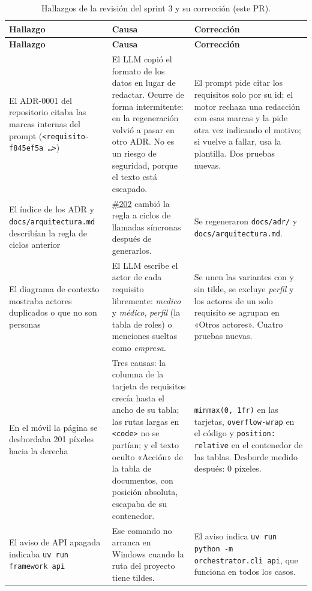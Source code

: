 \documentclass[11pt,a4paper]{report}
\newcommand{\pr}[1]{\href{https://github.com/PracticasESPE/Framework_Desarrollo_Seguro/pull/#1}{\##1}}
\begin{document}
{\small
\begin{longtable}{@{}P{3.6cm}P{5.2cm}P{5.4cm}@{}}
\caption{Hallazgos de la revisión del sprint 3 y su corrección (este PR).}\\
\toprule
\textbf{Hallazgo} & \textbf{Causa} & \textbf{Corrección}\\
\midrule
\endfirsthead
\toprule
\textbf{Hallazgo} & \textbf{Causa} & \textbf{Corrección}\\
\midrule
\endhead
El ADR-0001 del repositorio citaba las marcas internas del prompt (\texttt{<requisito-f845ef5a …>}) & El LLM copió el formato de los datos en lugar de redactar. Ocurre de forma intermitente: en la regeneración volvió a pasar en otro ADR. No es un riesgo de seguridad, porque el texto está escapado. & El prompt pide citar los requisitos solo por su id; el motor rechaza una redacción con esas marcas y la pide otra vez indicando el motivo; si vuelve a fallar, usa la plantilla. Dos pruebas nuevas.\\
El índice de los ADR y \texttt{docs/arquitectura.md} describían la regla de ciclos anterior & \pr{202} cambió la regla a ciclos de llamadas síncronas después de generarlos. & Se regeneraron \texttt{docs/adr/} y \texttt{docs/arquitectura.md}.\\
El diagrama de contexto mostraba actores duplicados o que no son personas & El LLM escribe el actor de cada requisito libremente: \emph{medico} y \emph{médico}, \emph{perfil} (la tabla de roles) o menciones sueltas como \emph{empresa}. & Se unen las variantes con y sin tilde, se excluye \emph{perfil} y los actores de un solo requisito se agrupan en «Otros actores». Cuatro pruebas nuevas.\\
En el móvil la página se desbordaba 201 píxeles hacia la derecha & Tres causas: la columna de la tarjeta de requisitos crecía hasta el ancho de su tabla; las rutas largas en \texttt{<code>} no se partían; y el texto oculto «Acción» de la tabla de documentos, con posición absoluta, escapaba de su contenedor. & \texttt{minmax(0, 1fr)} en las tarjetas, \texttt{overflow-wrap} en el código y \texttt{position: relative} en el contenedor de las tablas. Desborde medido después: 0 píxeles.\\
El aviso de API apagada indicaba \texttt{uv run framework api} & Ese comando no arranca en Windows cuando la ruta del proyecto tiene tildes. & El aviso indica \texttt{uv run python -m orchestrator.cli api}, que funciona en todos los casos.\\
\bottomrule
\end{longtable}}
\end{document}
